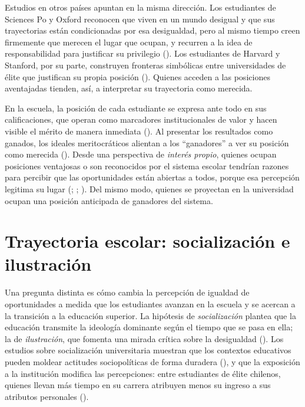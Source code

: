 \documentclass[
  spanish,
  a4paper,
  oneside]{scrbook}
\begin{document}
Estudios en otros países apuntan en la misma dirección. Los estudiantes
de Sciences Po y Oxford reconocen que viven en un mundo desigual y que
sus trayectorias están condicionadas por esa desigualdad, pero al mismo
tiempo creen firmemente que merecen el lugar que ocupan, y recurren a la
idea de responsabilidad para justificar su privilegio
(). Los
estudiantes de Harvard y Stanford, por su parte, construyen fronteras
simbólicas entre universidades de élite que justifican su propia
posición (). Quienes acceden a las posiciones aventajadas tienden, así, a
interpretar su trayectoria como merecida.

En la escuela, la posición de cada estudiante se expresa ante todo en
sus calificaciones, que operan como marcadores institucionales de valor
y hacen visible el mérito de manera inmediata
(). Al presentar los
resultados como ganados, los ideales meritocráticos alientan a los
``ganadores'' a ver su posición como merecida
(). Desde una
perspectiva de \emph{interés propio}, quienes ocupan posiciones
ventajosas o son reconocidos por el sistema escolar tendrían razones
para percibir que las oportunidades están abiertas a todos, porque esa
percepción legitima su lugar (; ; ). Del mismo modo, quienes se proyectan en la universidad ocupan
una posición anticipada de ganadores del sistema.

\section{Trayectoria escolar: socialización e
ilustración}\label{trayectoria-escolar-socializaciuxf3n-e-ilustraciuxf3n}

Una pregunta distinta es cómo cambia la percepción de igualdad de
oportunidades a medida que los estudiantes avanzan en la escuela y se
acercan a la transición a la educación superior. La hipótesis de
\emph{socialización} plantea que la educación transmite la ideología
dominante según el tiempo que se pasa en ella; la de \emph{ilustración},
que fomenta una mirada crítica sobre la desigualdad
(). Los
estudios sobre socialización universitaria muestran que los contextos
educativos pueden moldear actitudes sociopolíticas de forma duradera
(), y que la
exposición a la institución modifica las percepciones: entre estudiantes
de élite chilenos, quienes llevan más tiempo en su carrera atribuyen
menos su ingreso a sus atributos personales
().
\end{document}

